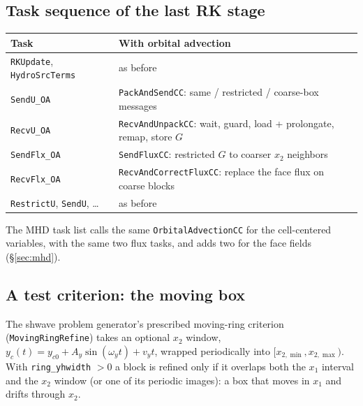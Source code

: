 \documentclass[11pt]{article}
\newcommand{\code}[1]{\texttt{#1}}
\newcommand{\fn}[1]{\texttt{\small #1}}
\begin{document}
\subsection{Task sequence of the last RK stage}
\begin{center}
\small
\begin{tabular}{@{}lp{10.5cm}@{}}
\toprule
Task & With orbital advection \\
\midrule
\fn{RKUpdate}, \fn{HydroSrcTerms} & as before \\
\fn{SendU\_OA} & \fn{PackAndSendCC}: same / restricted / coarse-box messages \\
\fn{RecvU\_OA} & \fn{RecvAndUnpackCC}: wait, guard, load + prolongate, remap, store $G$ \\
\fn{SendFlx\_OA} & \fn{SendFluxCC}: restricted $G$ to coarser $x_2$ neighbors \\
\fn{RecvFlx\_OA} & \fn{RecvAndCorrectFluxCC}: replace the face flux on coarse blocks \\
\fn{RestrictU}, \fn{SendU}, \ldots & as before \\
\bottomrule
\end{tabular}
\end{center}
\noindent
The MHD task list calls the same \fn{OrbitalAdvectionCC} for the cell-centered variables,
with the same two flux tasks, and adds two for the face fields (\S\ref{sec:mhd}).

\subsection{A test criterion: the moving box}
The shwave problem generator's prescribed moving-ring criterion (\fn{MovingRingRefine})
takes an optional $x_2$ window, $y_c(t) = y_{c0} + A_y\sin(\omega_y t) + v_y t$, wrapped
periodically into $[x_{2,\min}, x_{2,\max})$. With \code{ring\_yhwidth} $> 0$ a block is
refined only if it overlaps both the $x_1$ interval and the $x_2$ window (or one of its
periodic images): a box that moves in $x_1$ and drifts through $x_2$.
\end{document}
